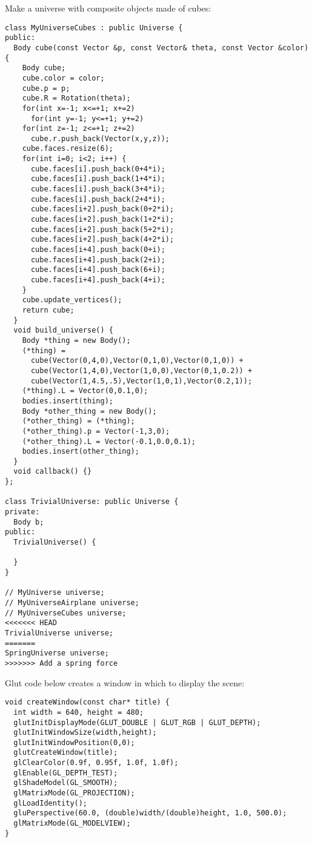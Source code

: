 Make a universe with composite objects made of cubes: \begin{lstlisting}
class MyUniverseCubes : public Universe {
public:
  Body cube(const Vector &p, const Vector& theta, const Vector &color) {
    Body cube;
    cube.color = color;
    cube.p = p;
    cube.R = Rotation(theta);
    for(int x=-1; x<=+1; x+=2)
      for(int y=-1; y<=+1; y+=2)
	for(int z=-1; z<=+1; z+=2)
	  cube.r.push_back(Vector(x,y,z));
    cube.faces.resize(6);    
    for(int i=0; i<2; i++) {
      cube.faces[i].push_back(0+4*i);
      cube.faces[i].push_back(1+4*i);
      cube.faces[i].push_back(3+4*i);
      cube.faces[i].push_back(2+4*i);
      cube.faces[i+2].push_back(0+2*i);
      cube.faces[i+2].push_back(1+2*i);
      cube.faces[i+2].push_back(5+2*i);
      cube.faces[i+2].push_back(4+2*i);
      cube.faces[i+4].push_back(0+i);
      cube.faces[i+4].push_back(2+i);
      cube.faces[i+4].push_back(6+i);
      cube.faces[i+4].push_back(4+i);
    }
    cube.update_vertices();
    return cube;
  }
  void build_universe() {
    Body *thing = new Body();
    (*thing) = 
      cube(Vector(0,4,0),Vector(0,1,0),Vector(0,1,0)) +
      cube(Vector(1,4,0),Vector(1,0,0),Vector(0,1,0.2)) +
      cube(Vector(1,4.5,.5),Vector(1,0,1),Vector(0.2,1));		    
    (*thing).L = Vector(0,0.1,0);    
    bodies.insert(thing);
    Body *other_thing = new Body();
    (*other_thing) = (*thing);
    (*other_thing).p = Vector(-1,3,0);
    (*other_thing).L = Vector(-0.1,0.0,0.1);
    bodies.insert(other_thing);    
  }
  void callback() {}
};

class TrivialUniverse: public Universe {
private:
  Body b;
public:
  TrivialUniverse() {
    
  }
}

// MyUniverse universe;
// MyUniverseAirplane universe;
// MyUniverseCubes universe;
<<<<<<< HEAD
TrivialUniverse universe;
=======
SpringUniverse universe;
>>>>>>> Add a spring force
\end{lstlisting}
\noindent
Glut code below
creates a window in which to display the scene: \begin{lstlisting}
void createWindow(const char* title) {
  int width = 640, height = 480;
  glutInitDisplayMode(GLUT_DOUBLE | GLUT_RGB | GLUT_DEPTH);
  glutInitWindowSize(width,height);
  glutInitWindowPosition(0,0);
  glutCreateWindow(title);
  glClearColor(0.9f, 0.95f, 1.0f, 1.0f);
  glEnable(GL_DEPTH_TEST);
  glShadeModel(GL_SMOOTH);  
  glMatrixMode(GL_PROJECTION);
  glLoadIdentity();
  gluPerspective(60.0, (double)width/(double)height, 1.0, 500.0);
  glMatrixMode(GL_MODELVIEW);
}
\end{lstlisting}

